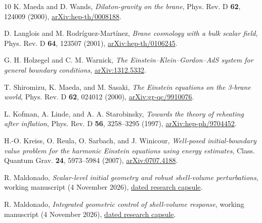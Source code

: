 \documentclass[11pt]{article}
\begin{document}
\begin{thebibliography}{10}
K. Maeda and D. Wands, \emph{Dilaton-gravity on the brane},
Phys. Rev. D \textbf{62}, 124009 (2000),
\href{https://arxiv.org/abs/hep-th/0008188}{arXiv:hep-th/0008188}.

D. Langlois and M. Rodr\'iguez-Mart\'inez,
\emph{Brane cosmology with a bulk scalar field},
Phys. Rev. D \textbf{64}, 123507 (2001),
\href{https://arxiv.org/abs/hep-th/0106245}{arXiv:hep-th/0106245}.

G. H. Holzegel and C. M. Warnick,
\emph{The Einstein--Klein--Gordon--AdS system for general boundary conditions},
\href{https://arxiv.org/abs/1312.5332}{arXiv:1312.5332}.

T. Shiromizu, K. Maeda, and M. Sasaki,
\emph{The Einstein equations on the 3-brane world},
Phys. Rev. D \textbf{62}, 024012 (2000),
\href{https://arxiv.org/abs/gr-qc/9910076}{arXiv:gr-qc/9910076}.

L. Kofman, A. Linde, and A. A. Starobinsky,
\emph{Towards the theory of reheating after inflation},
Phys. Rev. D \textbf{56}, 3258--3295 (1997),
\href{https://arxiv.org/abs/hep-ph/9704452}{arXiv:hep-ph/9704452}.

H.-O. Kreiss, O. Reula, O. Sarbach, and J. Winicour,
\emph{Well-posed initial-boundary value problem for the harmonic Einstein
equations using energy estimates},
Class. Quantum Grav. \textbf{24}, 5973--5984 (2007),
\href{https://arxiv.org/abs/0707.4188}{arXiv:0707.4188}.

R. Maldonado, \emph{Scalar-level initial geometry and robust shell-volume
perturbations}, working manuscript (4 November 2026),
\href{https://github.com/maldonado-research/HDblast/tree/main/research/HDBLAST_INTRINSIC_PREPARATION_ROBUSTNESS_20261104}{dated research capsule}.

R. Maldonado, \emph{Integrated geometric control of shell-volume response},
working manuscript (4 November 2026),
\href{https://github.com/maldonado-research/HDblast/tree/main/research/HDBLAST_H1_PREPARATION_RESPONSE_20261104}{dated research capsule}.
\end{thebibliography}
\end{document}
